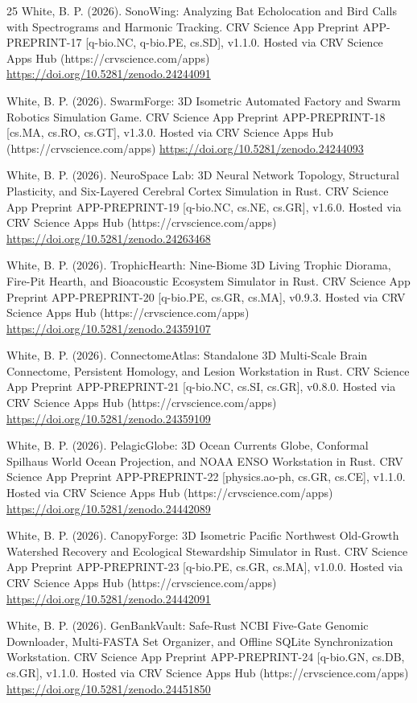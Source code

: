 \documentclass[10pt,letterpaper]{article}
\begin{document}
\begin{thebibliography}{25}
 White, B. P. (2026). SonoWing: Analyzing Bat Echolocation and Bird Calls with Spectrograms and Harmonic Tracking. CRV Science App Preprint APP-PREPRINT-17 [q-bio.NC, q-bio.PE, cs.SD], v1.1.0. Hosted via CRV Science Apps Hub (https://crvscience.com/apps) \url{https://doi.org/10.5281/zenodo.24244091}

 White, B. P. (2026). SwarmForge: 3D Isometric Automated Factory and Swarm Robotics Simulation Game. CRV Science App Preprint APP-PREPRINT-18 [cs.MA, cs.RO, cs.GT], v1.3.0. Hosted via CRV Science Apps Hub (https://crvscience.com/apps) \url{https://doi.org/10.5281/zenodo.24244093}

 White, B. P. (2026). NeuroSpace Lab: 3D Neural Network Topology, Structural Plasticity, and Six-Layered Cerebral Cortex Simulation in Rust. CRV Science App Preprint APP-PREPRINT-19 [q-bio.NC, cs.NE, cs.GR], v1.6.0. Hosted via CRV Science Apps Hub (https://crvscience.com/apps) \url{https://doi.org/10.5281/zenodo.24263468}

 White, B. P. (2026). TrophicHearth: Nine-Biome 3D Living Trophic Diorama, Fire-Pit Hearth, and Bioacoustic Ecosystem Simulator in Rust. CRV Science App Preprint APP-PREPRINT-20 [q-bio.PE, cs.GR, cs.MA], v0.9.3. Hosted via CRV Science Apps Hub (https://crvscience.com/apps) \url{https://doi.org/10.5281/zenodo.24359107}

 White, B. P. (2026). ConnectomeAtlas: Standalone 3D Multi-Scale Brain Connectome, Persistent Homology, and Lesion Workstation in Rust. CRV Science App Preprint APP-PREPRINT-21 [q-bio.NC, cs.SI, cs.GR], v0.8.0. Hosted via CRV Science Apps Hub (https://crvscience.com/apps) \url{https://doi.org/10.5281/zenodo.24359109}

 White, B. P. (2026). PelagicGlobe: 3D Ocean Currents Globe, Conformal Spilhaus World Ocean Projection, and NOAA ENSO Workstation in Rust. CRV Science App Preprint APP-PREPRINT-22 [physics.ao-ph, cs.GR, cs.CE], v1.1.0. Hosted via CRV Science Apps Hub (https://crvscience.com/apps) \url{https://doi.org/10.5281/zenodo.24442089}

 White, B. P. (2026). CanopyForge: 3D Isometric Pacific Northwest Old-Growth Watershed Recovery and Ecological Stewardship Simulator in Rust. CRV Science App Preprint APP-PREPRINT-23 [q-bio.PE, cs.GR, cs.MA], v1.0.0. Hosted via CRV Science Apps Hub (https://crvscience.com/apps) \url{https://doi.org/10.5281/zenodo.24442091}

 White, B. P. (2026). GenBankVault: Safe-Rust NCBI Five-Gate Genomic Downloader, Multi-FASTA Set Organizer, and Offline SQLite Synchronization Workstation. CRV Science App Preprint APP-PREPRINT-24 [q-bio.GN, cs.DB, cs.GR], v1.1.0. Hosted via CRV Science Apps Hub (https://crvscience.com/apps) \url{https://doi.org/10.5281/zenodo.24451850}
\end{thebibliography}
\end{document}
